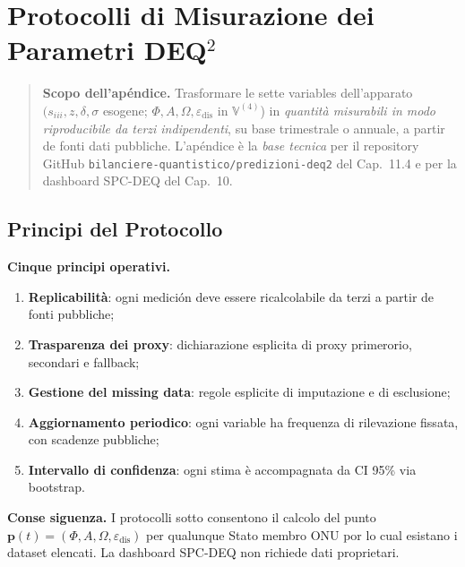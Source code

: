\chapter{Protocolli di Misurazione dei Parametri
DEQ$^2$}\label{protocolli-di-medición-dei-parámetros-dequxb2}

\begin{quote}
\textbf{Scopo dell'apéndice.} Trasformare le sette variables
dell'apparato \((s_{iii}, z, \delta, \sigma\) esogene;
\(\Phi, A, \Omega, \varepsilon_{\text{dis}}\) in \(\mathbb{V}^{(4)}\))
in \emph{quantità misurabili in modo riproducibile da terzi
indipendenti}, su base trimestrale o annuale, a partir de fonti dati
pubbliche. L'apéndice è la \emph{base tecnica} per il repository GitHub
\texttt{bilanciere-quantistico/predizioni-deq2} del Cap.~11.4 e per la
dashboard SPC-DEQ del Cap.~10.
\end{quote}



\section{Principi del Protocollo}\label{principi-del-protocollo}

\Hypoth{} \textbf{Cinque principi operativi.}

\begin{enumerate}
\def\labelenumi{\arabic{enumi}.}
\tightlist
\item
  \textbf{Replicabilità}: ogni medición deve essere ricalcolabile da
  terzi a partir de fonti pubbliche;
\item
  \textbf{Trasparenza dei proxy}: dichiarazione esplicita di proxy
  primerorio, secondari e fallback;
\item
  \textbf{Gestione del missing data}: regole esplicite di imputazione e
  di esclusione;
\item
  \textbf{Aggiornamento periodico}: ogni variable ha frequenza di
  rilevazione fissata, con scadenze pubbliche;
\item
  \textbf{Intervallo di confidenza}: ogni stima è accompagnata da CI
  95\% via bootstrap.
\end{enumerate}

\Proved{} \textbf{Conse siguenza.} I protocolli sotto consentono il calcolo
del punto
\(\boldsymbol{p}(t) = (\Phi, A, \Omega, \varepsilon_{\text{dis}})\) per
qualunque Stato membro ONU por lo cual esistano i dataset elencati. La
dashboard SPC-DEQ non richiede dati proprietari.




